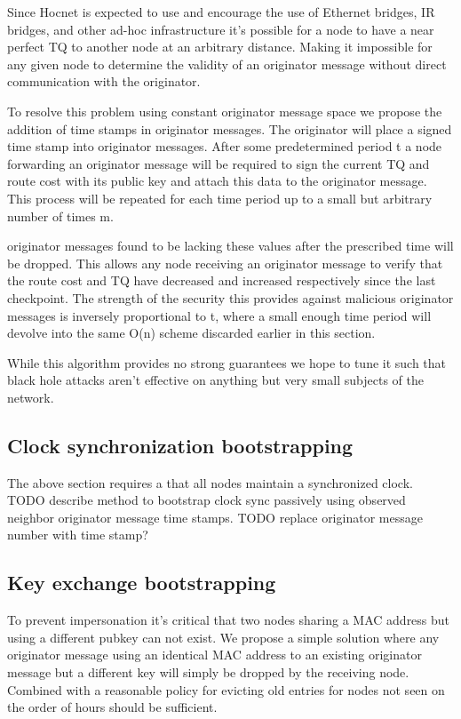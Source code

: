 \documentclass[11pt]{article}
\begin{document}
               Since Hocnet is expected to use and encourage the use of Ethernet bridges, IR bridges, and other ad-hoc infrastructure it's possible for a node to have a near perfect TQ to another node at an arbitrary distance. Making it impossible for any given node to determine the validity of an originator message without direct communication with the originator.
               
               To resolve this problem using constant originator message space we propose the addition of time stamps in originator messages. The originator will place a signed time stamp into originator messages. After some predetermined period t a node forwarding an originator message will be required to sign the current TQ and route cost with its public key and attach this data to the originator message. This process will be repeated for each time period up to a small but arbitrary number of times m.
               
               originator messages found to be lacking these values after the prescribed time will be dropped. This allows any node receiving an originator message to verify that the route cost and TQ have decreased and increased respectively since the last checkpoint. The strength of the security this provides against malicious originator messages is inversely proportional to t, where a small enough time period will devolve into the same O(n) scheme discarded earlier in this section. 
               
               While this algorithm provides no strong guarantees we hope to tune it such that black hole attacks aren't effective on anything but very small subjects of the network. 
    
    \subsection{Clock synchronization bootstrapping}
    
               The above section requires a that all nodes maintain a synchronized clock. TODO describe method to bootstrap clock sync passively using observed neighbor originator message time stamps. TODO replace originator message number with time stamp?
    
    
    \subsection{Key exchange bootstrapping}
    
               To prevent impersonation it's critical that two nodes sharing a MAC address but using a different pubkey can not exist. We propose a simple solution where any originator message using an identical MAC address to an existing originator message but a different key will simply be dropped by the receiving node. Combined with a reasonable policy for evicting old entries for nodes not seen on the order of hours should be sufficient. 
               
\end{document}
